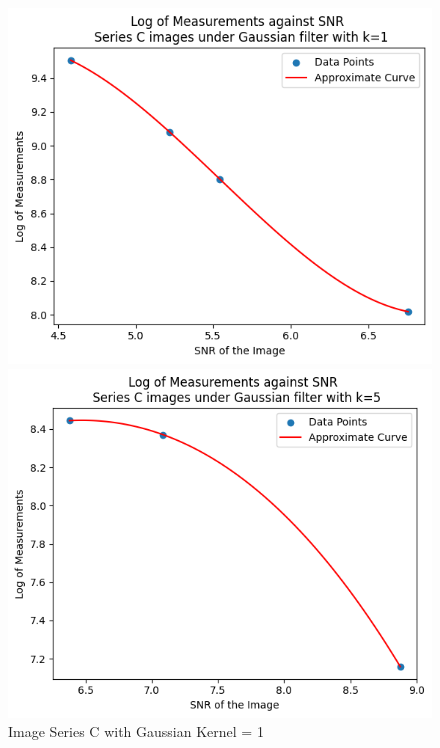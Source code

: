 \documentclass[runningheads]{llncs}
\begin{document}
\begin{figure}[h!]
\begin{minipage}[h]{0.47\linewidth}
\begin{center}
\includegraphics[width=1\linewidth]{Report/Result_Images/log_seriesC_Gaussian_1.png} 
\caption{Image Series C with Gaussian Kernel = 1}
\label{SeriesC_Log_Gaussian_1}
\end{center} 
\end{minipage}
\hfill
\vspace{0.2 cm}
\begin{minipage}[h]{0.47\linewidth}
\begin{center}
\includegraphics[width=1\linewidth]{Report/Result_Images/log_seriesC_Gaussian_5.png} 

\end{center}
\end{minipage}
\end{figure}
\end{document}
